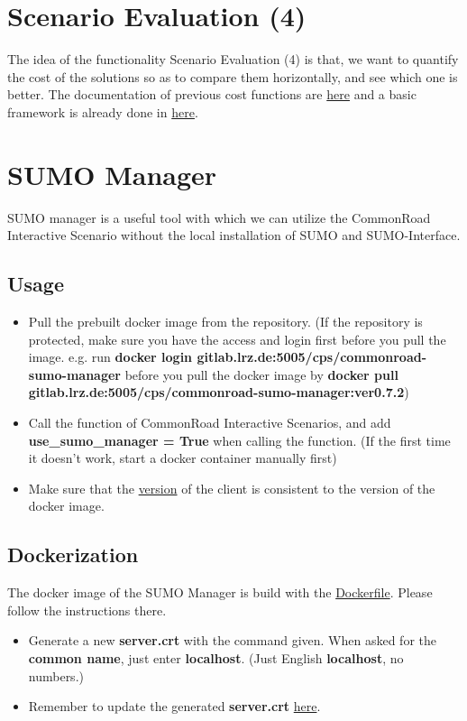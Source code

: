 \documentclass{article}
\begin{document}
\section{Scenario Evaluation (4)}

The idea of the functionality Scenario Evaluation (4) is that, we want to quantify the cost of the solutions so as to compare them horizontally, and see which one is better. The documentation of previous cost functions are \href{https://gitlab.lrz.de/tum-cps/commonroad-cost-functions/-/blob/master/costFunctions_commonRoad.pdf}{here} and a basic framework is already done in \href{https://gitlab.lrz.de/cps/commonroad-interactive-scenarios/-/blob/master/not_for_public_repo/evaluation/evaluate_solution.py}{here}.

\section{SUMO Manager}
SUMO manager is a useful tool with which we can utilize the CommonRoad Interactive Scenario without the local installation of SUMO and SUMO-Interface. 

\subsection{Usage}
\begin{itemize}
    \item Pull the prebuilt docker image from the repository. (If the repository is protected, make sure you have the access and login first before you pull the image. e.g. run \textbf{docker login gitlab.lrz.de:5005/cps/commonroad-sumo-manager} before you pull the docker image by \textbf{docker pull gitlab.lrz.de:5005/cps/commonroad-sumo-manager:ver0.7.2})
    \item Call the function of CommonRoad Interactive Scenarios, and add \textbf{use\_sumo\_manager = True} when calling the function. (If the first time it doesn't work, start a docker container manually first)
    \item Make sure that the \href{https://gitlab.lrz.de/cps/commonroad-sumo-manager/-/blob/master/commonroad_sumo_manager/crsumo/rpc/sumo_client.py#L30}{version} of the client is consistent to the version of the docker image.
\end{itemize}
\subsection{Dockerization}
The docker image of the SUMO Manager is build with the \href{https://gitlab.lrz.de/cps/sumo-interface/sumo_manager_server/Dockerfile}{Dockerfile}. Please follow the instructions there. 
\begin{itemize}
    \item Generate a new \textbf{server.crt} with the command given. When asked for the \textbf{common name}, just enter \textbf{localhost}. (Just English \textbf{localhost}, no numbers.)
    \item Remember to update the generated \textbf{server.crt} \href{https://gitlab.lrz.de/cps/commonroad-sumo-manager/-/tree/master/commonroad_sumo_manager/crsumo/rpc}{here}.
\end{itemize}
\end{document}
